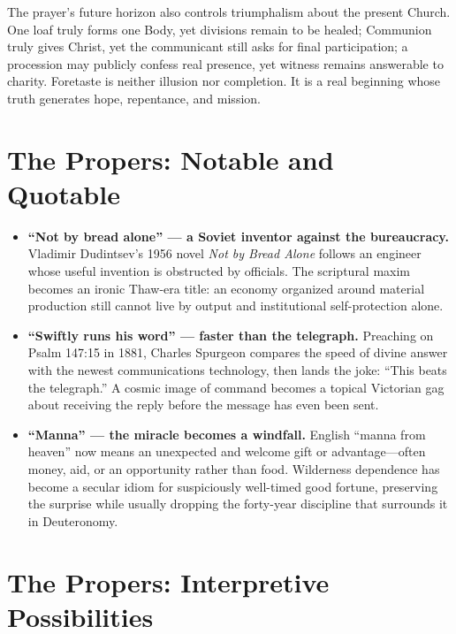 \begin{deepstudy}
The prayer's future horizon also controls triumphalism about the present Church. One loaf truly forms one Body, yet divisions remain to be healed; Communion truly gives Christ, yet the communicant still asks for final participation; a procession may publicly confess real presence, yet witness remains answerable to charity. Foretaste is neither illusion nor completion. It is a real beginning whose truth generates hope, repentance, and mission.

\section*{The Propers: Notable and Quotable}

{\small
\begin{itemize}[itemsep=0em,topsep=0.15em,parsep=0pt]
\item \textbf{“Not by bread alone” --- a Soviet inventor against the bureaucracy.\enspace{}} Vladimir Dudintsev's 1956 novel \emph{Not by Bread Alone} follows an engineer whose useful invention is obstructed by officials. The scriptural maxim becomes an ironic Thaw-era title: an economy organized around material production still cannot live by output and institutional self-protection alone.

\item \textbf{“Swiftly runs his word” --- faster than the telegraph.\enspace{}} Preaching on Psalm 147:15 in 1881, Charles Spurgeon compares the speed of divine answer with the newest communications technology, then lands the joke: “This beats the telegraph.” A cosmic image of command becomes a topical Victorian gag about receiving the reply before the message has even been sent.

\item \textbf{“Manna” --- the miracle becomes a windfall.\enspace{}} English “manna from heaven” now means an unexpected and welcome gift or advantage---often money, aid, or an opportunity rather than food. Wilderness dependence has become a secular idiom for suspiciously well-timed good fortune, preserving the surprise while usually dropping the forty-year discipline that surrounds it in Deuteronomy.
\end{itemize}
}

\section*{The Propers: Interpretive Possibilities}


\end{deepstudy}
